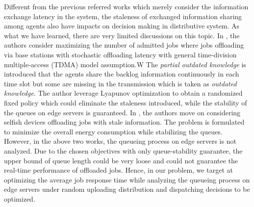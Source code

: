Different from the previous referred works which merely consider the information exchange latency in the system, the staleness of exchanged information sharing among agents also have impacts on decision making in distributive system.
As what we have learned, there are very limited discussions on this topic.
In \cite{JSAC17-LyuX}, the authors consider maximizing the number of admitted jobs where jobs offloading via base stations with stochastic offloading latency with general time-division multiple-access (TDMA) model assumption.W
The \emph{partial outdated knowledge} is introduced that the agents share the backlog information continuously in each time slot but some are missing in the transmission which is taken as \emph{outdated knowledge}.
The author leverage Lyapunov optimization to obtain a randomized fixed policy which could eliminate the staleness introduced, while the stability of the queues on edge servers is guaranteed. 
In \cite{TWC18-LyuX}, the authors move on considering selfish devices offloading jobs with stale information.
The problem is formulated to minimize the overall energy consumption while stabilizing the queues.
However, in the above two works, the queueing process on edge servers is not analyzed.
Due to the chosen objectives with only queue-stability guarantee, the upper bound of queue length could be very loose and could not guarantee the real-time performance of offloaded jobs.
Hence, in our problem, we target at optimizing the average job response time while analyzing the queueing process on edge servers under random uploading distribution and dispatching decisions to be optimized.

